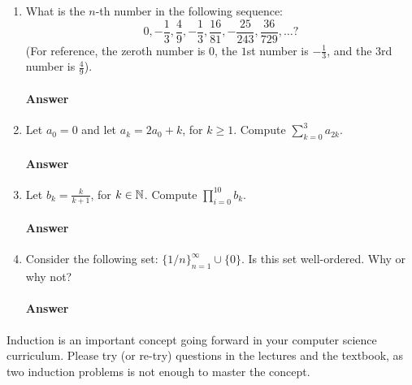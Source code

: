 \begin{enumerate}

    \item What is the $n$-th number in the following sequence:
        $$
            0, -\frac{1}{3}, \frac{4}{9}, -\frac{1}{3}, \frac{16}{81},
            -\frac{25}{243}, \frac{36}{729}, \ldots?
        $$
        (For reference,
        the zeroth number is $0$, the $1$st number is $-\frac{1}{3}$, and the $3$rd
        number is $\frac{4}{9}$).
        \paragraph{Answer}
        \todo{}

    \item Let $a_0=0$ and let $a_k=2a_0+k$, for $k\geq 1$.
        Compute $\sum_{k=0}^3 a_{2k}$.
        \paragraph{Answer}
        \todo{}

    \item Let $b_k=\frac{k}{k+1}$, for $k\in {\mathbb N}$.
        Compute  $\prod_{i=0}^{10} b_{k}$.
        \paragraph{Answer}
        \todo{}

    \item Consider the following set: $\{ 1/n\}_{n=1}^{\infty} \cup \{ 0 \}$.
        Is this set well-ordered. Why or why not?
        \paragraph{Answer}
        \todo{}



\end{enumerate}

\collab{\todo{}}

Induction is an important concept going forward in your computer science
curriculum.  Please try (or re-try) questions in the lectures and the textbook,
as two induction problems is not enough to master the concept.

